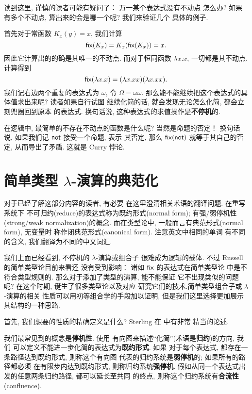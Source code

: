 读到这里, 谨慎的读者可能有疑问了： 万一某个表达式没有不动点
怎么办? 如果有多个不动点, 算出来的会是哪一个呢? 我们来验证几个
具体的例子.

首先对于常函数 \(K_x(y) = x\), 我们计算
\[\textnormal{\textsf{fix}}(K_x) = K_x(\textnormal{\textsf{fix}}(K_x)) = x.\]
因此它计算出的的确是其唯一的不动点. 而对于恒同函数
\(\lambda x. x\), 一切都是其不动点. 计算得到
\[\textnormal{\textsf{fix}}(\lambda x.x) = (\lambda x.xx)(\lambda x.xx).\]
我们记右边两个重复的表达式为 \(\omega\), 令 \(\Omega = \omega\omega\).
那么能不能继续把这个表达式的具体值求出来呢? 读者如果自行试图
继续化简的话, 就会发现无论怎么化简, 都会立刻兜圈回到原本
的表达式. 换句话说, 这种表达式的求值操作是\textbf{不停机}的.

在逻辑中, 最简单的不存在不动点的函数是什么呢? 当然是命题的否定！
换句话说, 如果我们记 \(\textnormal{\textsf{not}}\) 接受一个命题, 表示
其否定, 那么 \(\textnormal{\textsf{fix}}(\textnormal{\textsf{not}})\) 就等于其自己的否定,
从而导出了矛盾. 这就是 Curry 悖论.

\section{简单类型 \texorpdfstring{\(\lambda\)}{Lambda}-演算的典范化}
\label{beginning:ccc}
\begin{center}
\begin{tcolorbox}[text width=0.8\textwidth, title=关于译名]
对于已经了解这部分内容的读者, 有必要
在这里澄清相关术语的翻译问题. 在重写系统下
不可归约(reduce)的表达式称为既约形式(normal form);
有强/弱停机性(strong/weak normalization)的概念.
而在类型论中, 一般而言有典范形式(normal form), 无变量时
称作闭典范形式(canonical form). 注意英文中相同的单词
有不同的含义, 我们翻译为不同的中文词汇.
\end{tcolorbox}
\end{center}

我们上面已经看到, 不停机的 \(\lambda\)-演算或组合子
很难成为逻辑的载体. 不过 Russell 的简单类型论目前来看还
没有受到影响： 诸如 \(\textnormal{\textsf{fix}}\) 的表达式在简单类型论
中是不符合类型规则的. 那么对于添加了类型的演算, 能不能保证
它不出现类似的问题呢? 在这个时期, 诞生了很多类型论以及对应
研究它们的技术.简单类型组合子或 \(\lambda\)-演算的相关
性质可以用初等组合学的手段加以证明\cite{loader:1998:stlc},
但是我们这里选择更加展示其结构的一种思路\cite[\S4.2]{sterling:2021:thesis}.

首先, 我们想要的性质的精确定义是什么? Sterling
在 \cite[\S5.1]{sterling:2021:thesis} 中有非常
精当的论述.

我们最常见到的概念是\textbf{停机性}. 使用
有向图来描述“化简”(术语是\textbf{归约})的方向, 我们
可以定义不能进一步化简的表达式为\textbf{既约形式}. 如果
对于每个表达式, 都存在一条路径达到既约形式, 则称这个有向图
代表的归约系统是\textbf{弱停机}的; 如果所有的路径都必须
在有限步内达到既约形式, 则称归约系统\textbf{强停机}.
假如从同一个表达式出发的任意两条归约路径, 都可以延长至共同
的终点, 则称这个归约系统有\textbf{合流性}(confluence).


